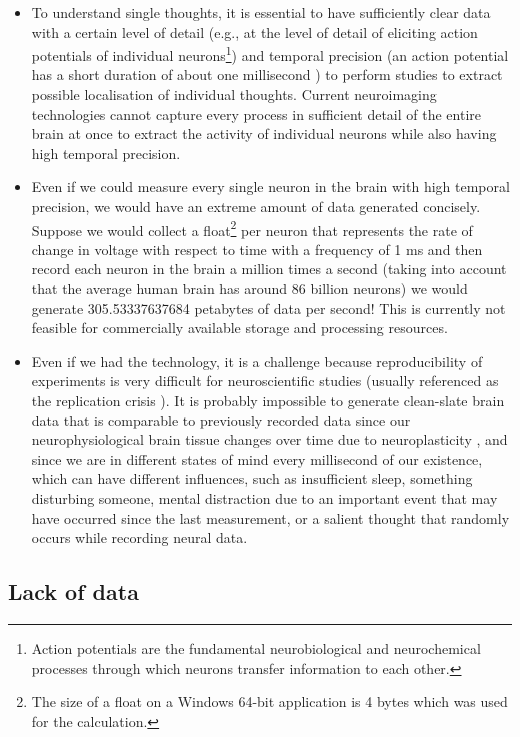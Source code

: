 \begin{itemize}
  \item To understand single thoughts, it is essential to have sufficiently clear data with a certain level of detail (e.g., at the level of detail of eliciting action potentials of individual neurons\footnote{Action potentials are the fundamental neurobiological and neurochemical processes through which neurons transfer information to each other.}) and temporal precision (an action potential has a short duration of about one millisecond \citep{byrne_resting_2021}) to perform studies to extract possible localisation of individual thoughts. Current neuroimaging technologies cannot capture every process in sufficient detail of the entire brain at once to extract the activity of individual neurons while also having high temporal precision.
  \item Even if we could measure every single neuron in the brain with high temporal precision, we would have an extreme amount of data generated concisely. Suppose we would collect a float\footnote{The size of a float on a Windows 64-bit application is 4 bytes which was used for the calculation.} per neuron that represents the rate of change in voltage with respect to time with a frequency of 1 ms and then record each neuron in the brain a million times a second (taking into account that the average human brain has around 86 billion neurons) we would generate 305.53337637684 petabytes of data per second! This is currently not feasible for commercially available storage and processing resources.
  \item Even if we had the technology, it is a challenge because reproducibility of experiments is very difficult for neuroscientific studies (usually referenced as the replication crisis \citep{maxwell_is_2015}). It is probably impossible to generate clean-slate brain data that is comparable to previously recorded data since our neurophysiological brain tissue changes over time due to neuroplasticity \citep{nierhaus_immediate_2021}, and since we are in different states of mind every millisecond of our existence, which can have different influences, such as insufficient sleep, something disturbing someone, mental distraction due to an important event that may have occurred since the last measurement, or a salient thought that randomly occurs while recording neural data.
\end{itemize}

\subsection{Lack of data}
\label{chapter2-lack-of-data}

